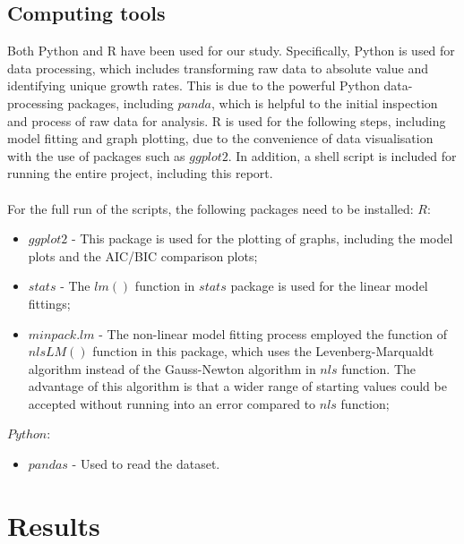\documentclass[11pt, oneside]{article}
\begin{document}
 		\subsection{Computing tools}
		Both Python and R have been used for our study. Specifically, Python is used for data processing, which includes transforming raw data to absolute value and identifying unique growth rates. This is due to the powerful Python data-processing packages, including \(panda\), which is helpful to the initial inspection and process of raw data for analysis. R is used for the following steps, including model fitting and graph plotting, due to the convenience of data visualisation with the use of packages such as \(ggplot2\). In addition, a shell script is included for running the entire project, including this report. \\
		\\
		For the full run of the scripts, the following packages need to be installed: 
 	\bigbreak
 	\noindent \(R:\)
 	\begin{itemize}
	\item \(ggplot2\) - This package is used for the plotting of graphs, including the model plots and the AIC/BIC comparison plots;
	\item \(stats\) - The \(lm()\) function in \(stats\) package is used for the linear model fittings;
	\item \(minpack.lm\) - The non-linear model fitting process employed the function of \(nlsLM()\) function in this package, which uses the Levenberg-Marqualdt algorithm instead of the Gauss-Newton algorithm in \(nls\) function. The advantage of this algorithm is that a wider range of starting values could be accepted without running into an error compared to \(nls\) function;
	\end{itemize}
	\(Python:\)
	\begin{itemize}
	\item \(pandas\) - Used to read the dataset.
	\end{itemize}
		\pagebreak
	\section{Results}
	
\end{document}
